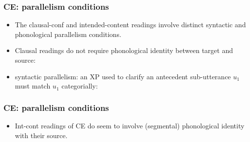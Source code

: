 \documentclass{beamer}
\begin{document}
\begin{frame}\frametitle{CE: parallelism conditions}

\begin{itemize}

\item  The clausal-conf and intended-content readings 
involve distinct syntactic and phonological parallelism conditions.  

\item Clausal readings do not require phonological 
identity between target and source:

{\tiny
{}}

\item syntactic parallelism: an XP used to
clarify an antecedent sub-utterance $u_1$ must match $u_1$
categorially:


{\tiny
{}}

\end{itemize}\end{frame}


\begin{frame}\frametitle{CE: parallelism conditions}

\begin{itemize}

\item
Int-cont readings of CE do seem to involve (segmental) phonological
identity with their source.


\end{itemize}\end{frame}
\end{document}
